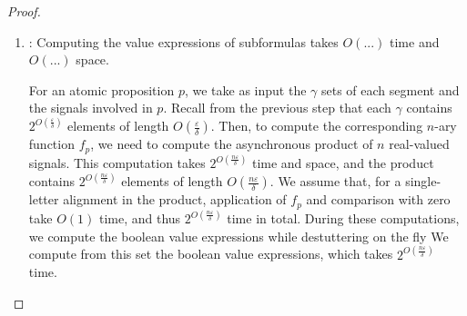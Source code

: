 \begin{proof}
\begin{enumerate}
		
		
		\item \TODO:
		Computing the value expressions of subformulas takes $O(...)$ time %
		and $O(...)$ space. %
		
		For an atomic proposition $p$, we take as input the $\gamma$ sets of each segment and the signals involved in $p$.
		Recall from the previous step that each $\gamma$ contains $2^{O(\frac{\varepsilon}{\delta})}$ elements of length $O(\frac{\varepsilon}{\delta})$.
		Then, to compute the corresponding $n$-ary function $f_p$, we need to compute the asynchronous product of $n$ real-valued signals.
		This computation takes $2^{O(\frac{n\varepsilon}{\delta})}$ time and space, and the product contains $2^{O(\frac{n\varepsilon}{\delta})}$ elements of length $O(\frac{n\varepsilon}{\delta})$.
		We assume that, for a single-letter alignment in the product, application of $f_p$ and comparison with zero take $O(1)$ time, and thus $2^{O(\frac{n\varepsilon}{\delta})}$ time in total.
		During these computations, we compute the boolean value expressions while destuttering on the fly
		We compute from this set the boolean value expressions, which takes $2^{O(\frac{n\varepsilon}{\delta})}$ time.
		
		
		
		

\end{enumerate}
\end{proof}
